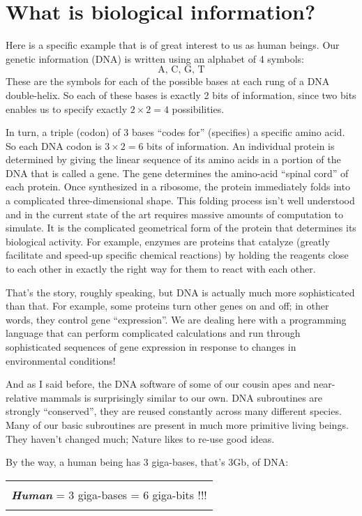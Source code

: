 \documentclass[12pt]{book}
\begin{document}
\section*{What is biological information?}

Here is a specific example that is of great interest to us as human beings.
Our genetic information (DNA) is written using an alphabet of 4 symbols:
\[
    \mbox{A, C, G, T}
\]
These are the symbols for each of the possible bases at each rung of a DNA double-helix.
So each of these bases is exactly 2 bits of information, since two bits enables us to
specify exactly $2 \times 2 = 4$ possibilities.
 
In turn, a triple (codon) of 3 bases ``codes for'' (specifies) a specific amino acid.
So each DNA codon is $3 \times 2 = 6$ bits of information.
An individual protein is determined by giving the linear sequence of its amino acids 
in a portion of the DNA that is called a gene.
The gene determines the amino-acid ``spinal cord'' of each protein.
Once synthesized in a ribosome, the protein immediately folds into a complicated three-dimensional
shape. This folding process isn't well understood and in the current state of the art requires
massive amounts of computation to simulate.  It is the complicated geometrical form of the protein
that determines its biological activity.  For example, enzymes are  proteins that catalyze
(greatly facilitate and speed-up specific chemical reactions) by holding the reagents close
to each other in exactly the right way for them to react with each other.
 
That's the story, roughly speaking, but
DNA is actually much more sophisticated than that.
For example, 
some proteins turn other genes on and off; in other words, they control gene ``expression''.
We are dealing here with a programming language that can perform complicated
calculations and run through sophisticated sequences of gene expression in response to changes in
environmental conditions!
 
And as I said before, the DNA
software of some of our cousin apes and near-relative mammals is surprisingly similar to our own.
DNA subroutines are strongly ``conserved'', they are reused constantly
across many different species. Many of our basic subroutines are present in much more primitive living
beings. They haven't changed much; Nature likes to re-use good ideas.
 
By the way, a human being has 3 giga-bases, that's 3Gb, of DNA: 
 
\begin{center}
\begin{tabular}{|c|}
\hline
\\
\textbf{\emph{\large Human}} = 3 giga-bases = 6 giga-bits !!!
\\
\\
\hline
\end{tabular}
\end{center}
 
\end{document}
